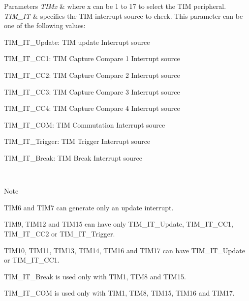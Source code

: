 \begin{DoxyParams}{Parameters}
{\em T\+I\+Mx} & where x can be 1 to 17 to select the T\+IM peripheral. \\
\hline
{\em T\+I\+M\+\_\+\+IT} & specifies the T\+IM interrupt source to check. This parameter can be one of the following values\+: \begin{DoxyItemize}
\item T\+I\+M\+\_\+\+I\+T\+\_\+\+Update\+: T\+IM update Interrupt source \item T\+I\+M\+\_\+\+I\+T\+\_\+\+C\+C1\+: T\+IM Capture Compare 1 Interrupt source \item T\+I\+M\+\_\+\+I\+T\+\_\+\+C\+C2\+: T\+IM Capture Compare 2 Interrupt source \item T\+I\+M\+\_\+\+I\+T\+\_\+\+C\+C3\+: T\+IM Capture Compare 3 Interrupt source \item T\+I\+M\+\_\+\+I\+T\+\_\+\+C\+C4\+: T\+IM Capture Compare 4 Interrupt source \item T\+I\+M\+\_\+\+I\+T\+\_\+\+C\+OM\+: T\+IM Commutation Interrupt source \item T\+I\+M\+\_\+\+I\+T\+\_\+\+Trigger\+: T\+IM Trigger Interrupt source \item T\+I\+M\+\_\+\+I\+T\+\_\+\+Break\+: T\+IM Break Interrupt source \end{DoxyItemize}
\\
\hline
\end{DoxyParams}
\begin{DoxyNote}{Note}

\begin{DoxyItemize}
\item T\+I\+M6 and T\+I\+M7 can generate only an update interrupt.
\item T\+I\+M9, T\+I\+M12 and T\+I\+M15 can have only T\+I\+M\+\_\+\+I\+T\+\_\+\+Update, T\+I\+M\+\_\+\+I\+T\+\_\+\+C\+C1, T\+I\+M\+\_\+\+I\+T\+\_\+\+C\+C2 or T\+I\+M\+\_\+\+I\+T\+\_\+\+Trigger.
\item T\+I\+M10, T\+I\+M11, T\+I\+M13, T\+I\+M14, T\+I\+M16 and T\+I\+M17 can have T\+I\+M\+\_\+\+I\+T\+\_\+\+Update or T\+I\+M\+\_\+\+I\+T\+\_\+\+C\+C1.
\item T\+I\+M\+\_\+\+I\+T\+\_\+\+Break is used only with T\+I\+M1, T\+I\+M8 and T\+I\+M15.
\item T\+I\+M\+\_\+\+I\+T\+\_\+\+C\+OM is used only with T\+I\+M1, T\+I\+M8, T\+I\+M15, T\+I\+M16 and T\+I\+M17.
\end{DoxyItemize}
\end{DoxyNote}

